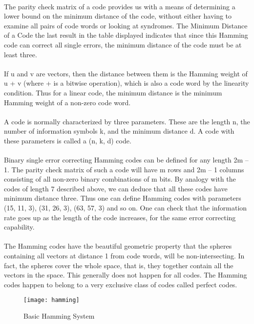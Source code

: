 \documentclass[14pt]{report}
\begin{document}
{\paragraph{} The parity check matrix of a code provides us with a means of determining a lower bound on the minimum distance of the code, without either having to examine all pairs of code words or looking at syndromes.  The Minimum Distance of a Code the last result in the table displayed indicates that since this Hamming code can correct all single errors, the minimum distance of the code must be at least three. 
\paragraph{} If u and v are vectors, then the distance between them is the Hamming weight of u + v (where + is a bitwise operation), which is also a code word by the linearity condition. Thus for a linear code, the minimum distance is the minimum Hamming weight of a non-zero code word.    
\paragraph{} A code is normally characterized by three parameters. These are the length n, the number of information symbols k, and the minimum distance d. A code with these parameters is called a  (n, k, d) code.
\paragraph{} Binary single error correcting Hamming codes can be defined for any length 2m – 1. The parity check matrix of such a code will have m rows and 2m – 1 columns consisting of all non-zero binary combinations of m bits. By analogy with the codes of length 7 described above, we can deduce that all these codes have minimum distance three. Thus one can define Hamming codes with parameters (15, 11, 3), (31, 26, 3), (63, 57, 3) and so on. One can check that the information rate goes up as the length of the code increases, for the same error correcting capability.

\paragraph{} The Hamming codes have the beautiful geometric property that the spheres containing all vectors at distance 1 from code words, will be non-intersecting. In fact, the spheres cover the whole space, that is, they together contain all the vectors in the space. This generally does not happen for all codes. The Hamming codes happen to belong to a very exclusive class of codes called perfect codes.
\begin{figure}[ht]
\centering
\texttt{[image: hamming]}
\label{fig:awgn}
\caption{Basic Hamming System}
\end{figure}
}
\end{document}
